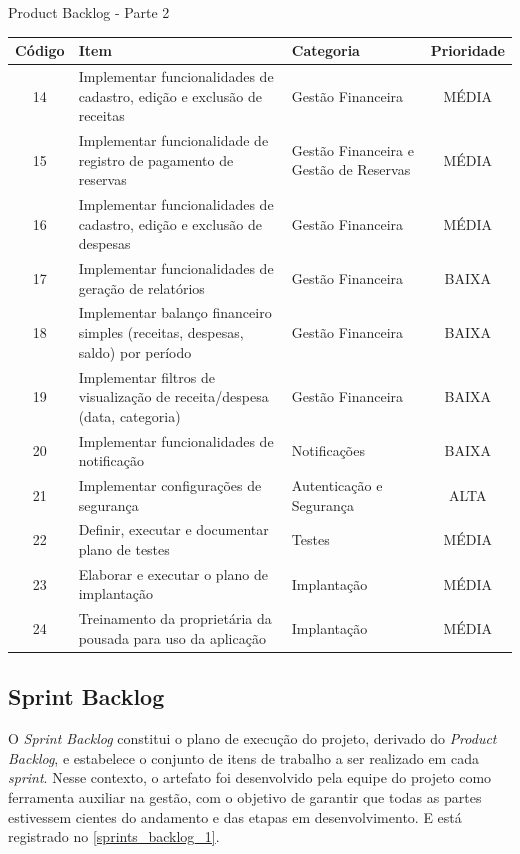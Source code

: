 \documentclass[
	12pt,				%
	openany,			%
	oneside,			%
	a4paper,			%
	english,			%
	french,				%
	spanish,			%
	brazil				%
	]{abntex2}
\begin{document}
\begin{quadro}[H]
	\caption{Product Backlog - Parte 2}
	\label{product_backlog_2}
	\begin{tabular}{|c|p{6.5cm}|p{3.8cm}|c|}
		\hline
		\textbf{Código} & \textbf{Item} & \textbf{Categoria} & \textbf{Prioridade} \\	\hline	
		14 & Implementar funcionalidades de cadastro, edição e exclusão de receitas & Gestão Financeira & MÉDIA \\ \hline
		15 & Implementar funcionalidade de registro de pagamento de reservas &Gestão Financeira e Gestão de Reservas &
		MÉDIA \\ \hline
		16 & Implementar funcionalidades de cadastro, edição e exclusão de despesas &
		Gestão Financeira & MÉDIA \\ \hline
		17 & Implementar funcionalidades de geração de relatórios &
		Gestão Financeira &	BAIXA \\ \hline
		18 & Implementar balanço financeiro simples (receitas, despesas, saldo) por período & Gestão Financeira & BAIXA \\ \hline
		19 & Implementar filtros de visualização de receita/despesa (data, categoria) &	Gestão Financeira & BAIXA \\ \hline
		20 & Implementar  funcionalidades de notificação & Notificações &
		BAIXA \\ \hline
		21 & Implementar configurações de segurança &	Autenticação e Segurança &
		ALTA \\ \hline
		22 & Definir, executar e documentar plano de testes & Testes & MÉDIA \\ \hline
		23 & Elaborar e executar o plano de implantação & Implantação & 
		MÉDIA \\ \hline
		24 & Treinamento da proprietária da pousada para uso da aplicação &	Implantação & MÉDIA \\ \hline
	\end{tabular}
\end{quadro}
% 
\subsection{Sprint Backlog}
O \textit{Sprint Backlog} constitui o plano de execução do projeto, derivado do \textit{Product Backlog}, e estabelece o conjunto de itens de trabalho a ser realizado em cada \textit {sprint}. Nesse contexto, o artefato foi desenvolvido pela equipe do projeto como ferramenta auxiliar na gestão, com o objetivo de garantir que todas as partes estivessem cientes do andamento e das etapas em desenvolvimento. E está registrado no  \autoref{sprints_backlog_1}.
\end{document}
